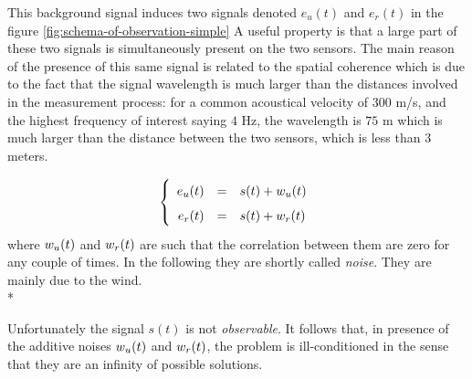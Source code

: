 This  background signal  induces two  signals denoted $e_{u}(t)$ and $e_{r}(t)$ in the figure \ref{fig:schema-of-observation-simple}
A useful property is that a large part of these two signals is simultaneously present  on the two sensors. The main reason of the presence of this same signal is related to the spatial coherence which is due to the fact that the signal wavelength is much larger than the distances  involved in the measurement process: for a common acoustical velocity of $300$ m/s, and the highest frequency of interest saying $4$ Hz, the wavelength is $75$ m which is much larger than the distance between the two sensors, which is less than 3 meters. 

\begin{eqnarray*}
\left\{
\renewcommand\arraystretch{1.6}
\begin{array}{rcl}
e_{\ut}(t)&=&s(t)+w_{\ut}(t)
\\
e_{\rf}(t)&=&s(t)+w_{\rf}(t)
\end{array}
\right.
\end{eqnarray*}
where $w_{{u}}(t)$ and $w_{{r}}(t)$ are such that the correlation between them are zero for any couple of times. In the following they are shortly called \emph{noise}.  They are mainly due to the wind.\\*

Unfortunately the signal $s(t)$ is not  \emph{observable}. It follows that, in presence of the additive noises $w_{{u}}(t)$ and $w_{{r}}(t)$, the problem is ill-conditioned in the sense that they are an infinity of possible solutions.







